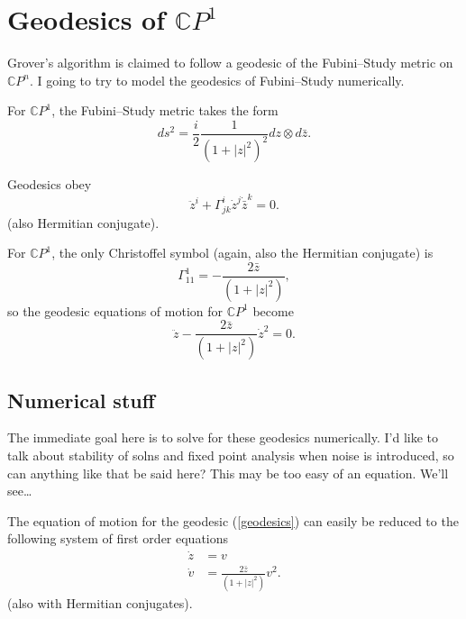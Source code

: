\documentclass[titlepage,12pt]{utarticle}
\begin{document}
\section{Geodesics of $\mathbb{C}P^1$}\label{sec:geodesics_cp1}

Grover's algorithm is claimed\cite{9910115} to follow a geodesic of
the Fubini--Study metric on $\mathbb{C}P^n$.
I going to try to model the geodesics of Fubini--Study numerically.

For $\mathbb{C}P^1$, the Fubini--Study metric takes
the form\cite{Nash}
\begin{equation}
ds^2 = \frac{i}{2} \frac{1}
                        {(1 + |z|^2)^2}
       dz\otimes d{\bar z}.
\label{FSmetric}
\end{equation}

Geodesics obey 
\begin{equation}
{\ddot z}^i + \Gamma^i_{jk}{\dot z}^j{\dot{\bar z}}^k = 0.
\end{equation}
(also Hermitian conjugate).

For $\mathbb{C}P^1$, the only Christoffel symbol
(again, also the Hermitian conjugate) is
\begin{equation}
\Gamma^1_{11} = - \frac{2{\bar z}}
                       {(1 + |z|^2)},
\end{equation}
so the geodesic equations of motion for $\mathbb{C}P^1$
become
\begin{equation}
{\ddot z} - \frac{2{\bar z}}
                   {(1 + |z|^2)}
              {\dot z}^2 = 0.
\label{geodesics}
\end{equation}


\subsection{Numerical stuff}

The immediate goal here is to solve for these geodesics
numerically.  I'd like to talk about stability of solns
and fixed point analysis when noise is introduced, so
can anything like that be said here?  This may be too easy
of an equation.  We'll see\dots

The equation of motion for the geodesic (\ref{geodesics})
can easily be reduced to the following
system of first order equations
\begin{align}
{\dot z} &= v\\
{\dot v} &= \frac{2{\bar z}}
                   {(1 + |z|^2)}
              v^2.
\label{firstorder}
\end{align}
(also with Hermitian conjugates).
\end{document}

